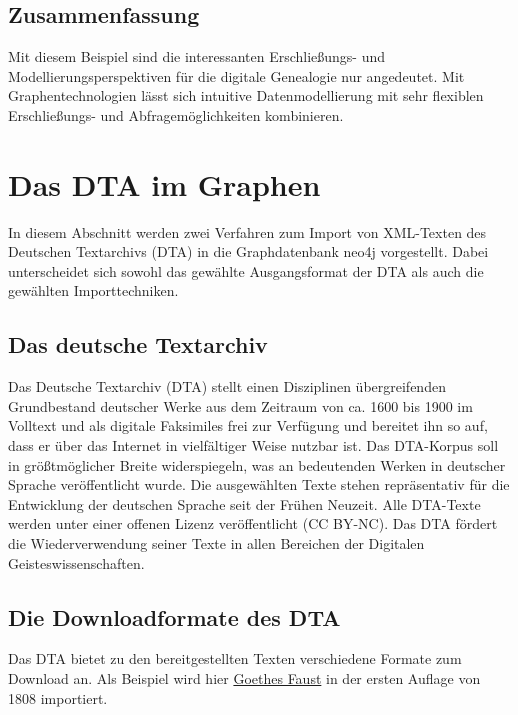 \documentclass[ngerman,]{scrreprt}
\begin{document}
\section{Zusammenfassung}\label{zusammenfassung-3}

Mit diesem Beispiel sind die interessanten Erschließungs- und Modellierungsperspektiven für die digitale Genealogie nur angedeutet. Mit Graphentechnologien lässt sich intuitive Datenmodellierung mit sehr flexiblen Erschließungs- und Abfragemöglichkeiten kombinieren.

\chapter{Das DTA im Graphen}\label{das-dta-im-graphen}

In diesem Abschnitt werden zwei Verfahren zum Import von XML-Texten des Deutschen Textarchivs (DTA) in die Graphdatenbank neo4j vorgestellt. Dabei unterscheidet sich sowohl das gewählte Ausgangsformat der DTA als auch die gewählten Importtechniken.

\section{Das deutsche Textarchiv}\label{das-deutsche-textarchiv}

Das Deutsche Textarchiv (DTA) stellt einen Disziplinen übergreifenden Grundbestand deutscher Werke aus dem Zeitraum von ca. 1600 bis 1900 im Volltext und als digitale Faksimiles frei zur Verfügung und bereitet ihn so auf, dass er über das Internet in vielfältiger Weise nutzbar ist. Das DTA-Korpus soll in größtmöglicher Breite widerspiegeln, was an bedeutenden Werken in deutscher Sprache veröffentlicht wurde. Die ausgewählten Texte stehen repräsentativ für die Entwicklung der deutschen Sprache seit der Frühen Neuzeit. Alle DTA-Texte werden unter einer offenen Lizenz veröffentlicht (CC BY-NC). Das DTA fördert die Wiederverwendung seiner Texte in allen Bereichen der Digitalen Geisteswissenschaften.

\section{Die Downloadformate des DTA}\label{die-downloadformate-des-dta}

Das DTA bietet zu den bereitgestellten Texten verschiedene Formate zum Download an. Als Beispiel wird hier \href{http://deutschestextarchiv.de/book/show/goethe_faust01_1808}{Goethes Faust} in der ersten Auflage von 1808 importiert.
\end{document}
